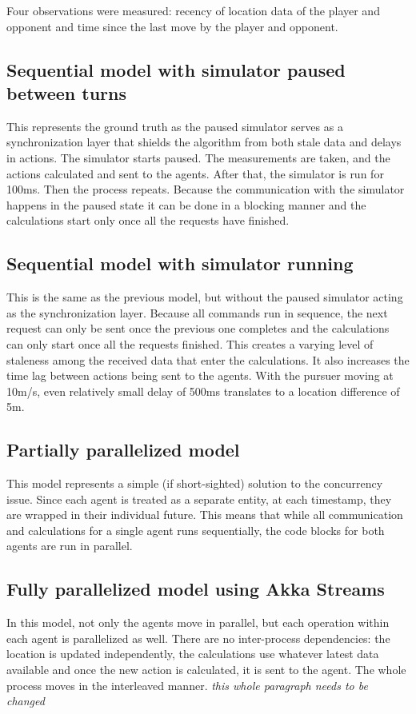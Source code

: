 \documentclass{article}
\begin{document}
Four observations were measured: recency of location data of the player and opponent and time since the last move by the player and opponent.

\subsection{Sequential model with simulator paused between turns}
This represents the ground truth as the paused simulator serves as a synchronization layer that shields the algorithm from both stale data and delays in actions. The simulator starts paused. The measurements are taken, and the actions calculated and sent to the agents. After that, the simulator is run for 100ms. Then the process repeats. Because the communication with the simulator happens in the paused state it can be done in a blocking manner and the calculations start only once all the requests have finished.

\subsection{Sequential model with simulator running}
This is the same as the previous model, but without the paused simulator acting as the synchronization layer. Because all commands run in sequence, the next request can only be sent once the previous one completes and the calculations can only start once all the requests finished. This creates a varying level of staleness among the received data that enter the calculations. It also increases the time lag between actions being sent to the agents. With the pursuer moving at 10m/s, even relatively small delay of 500ms translates to a location difference of 5m.

\subsection{Partially parallelized model}
This model represents a simple (if short-sighted) solution to the concurrency issue. Since each agent is treated as a separate entity, at each timestamp, they are wrapped in their individual future. This means that while all communication and calculations for a single agent runs sequentially, the code blocks for both agents are run in parallel.

\subsection{Fully parallelized model using Akka Streams}
In this model, not only the agents move in parallel, but each operation within each agent is parallelized as well. There are no inter-process dependencies: the location is updated independently, the calculations use whatever latest data available and once the new action is calculated, it is sent to the agent. The whole process moves in the interleaved manner. \emph{this whole paragraph needs to be changed}
\end{document}
